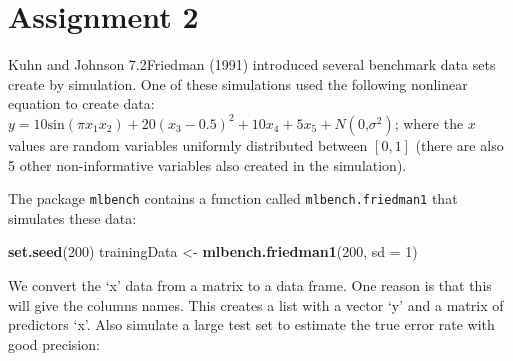 \documentclass[]{report}
\newenvironment{Shaded}{\begin{snugshade}}{\end{snugshade}}
\newcommand{\DataTypeTok}[1]{\textcolor[rgb]{0.13,0.29,0.53}{#1}}
\newcommand{\DecValTok}[1]{\textcolor[rgb]{0.00,0.00,0.81}{#1}}
\newcommand{\KeywordTok}[1]{\textcolor[rgb]{0.13,0.29,0.53}{\textbf{#1}}}
\newcommand{\NormalTok}[1]{#1}
\newcommand{\OperatorTok}[1]{\textcolor[rgb]{0.81,0.36,0.00}{\textbf{#1}}}
\newcommand{\StringTok}[1]{\textcolor[rgb]{0.31,0.60,0.02}{#1}}
\begin{document}
\hypertarget{AS-2}{%
\chapter*{Assignment 2}\label{AS-2}}


\begin{question}{Kuhn and Johnson 7.2}Friedman (1991) introduced several benchmark data sets create by simulation. One of these simulations used the following nonlinear equation to create data: $y = 10\text{sin}(\pi x_1 x_2)+20(x_3-0.5)^2+10x_4+5x_5+N(0\text{,} \sigma^2)$; where the $x$ values are random variables uniformly distributed between $[0, 1]$ (there are also 5 other non-informative variables also created in the simulation). \end{question}

The package \texttt{mlbench} contains a function called
\texttt{mlbench.friedman1} that simulates these data:

\begin{Shaded}
\begin{Highlighting}[]
\KeywordTok{set.seed}\NormalTok{(}\DecValTok{200}\NormalTok{)}
\NormalTok{trainingData <-}\StringTok{ }\KeywordTok{mlbench.friedman1}\NormalTok{(}\DecValTok{200}\NormalTok{, }\DataTypeTok{sd =} \DecValTok{1}\NormalTok{)}
\end{Highlighting}
\end{Shaded}

We convert the `x' data from a matrix to a data frame. One reason is
that this will give the columns names. This creates a list with a vector
`y' and a matrix of predictors `x'. Also simulate a large test set to
estimate the true error rate with good precision:

\begin{Shaded}
\end{Shaded}
\end{document}
